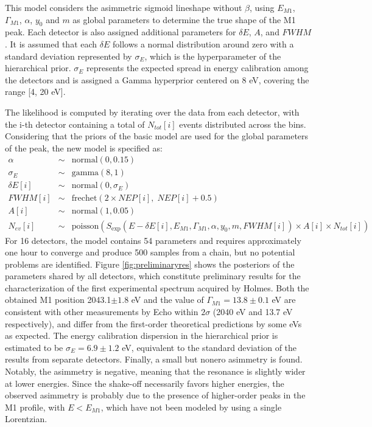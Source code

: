 This model considers the asimmetric sigmoid lineshape without $\beta$, using $E_{M 1}$, $\Gamma_{ M 1}$, $\alpha$, $y_0$
and $m$ as global parameters to determine the true shape of the M1 peak.
Each detector is also assigned additional parameters for $\delta E$, $A$, and $FWHM$. It is assumed that each $\delta E$ follows a normal distribution around zero with a standard deviation represented by $\sigma_E$, which is the hyperparameter of the hierarchical prior.
$\sigma_E$ represents the expected spread in energy calibration among the detectors and is assigned a Gamma hyperprior centered on 8 eV, covering the range [4, 20 eV].

The likelihood is computed by iterating over the data from each detector, with the i-th detector containing a total of
$N_{tot}[i]$ events distributed across the bins. Considering that the priors of the basic model are used for the global
parameters of the peak, the new model is specified as:
\begin{eqnarray}
  \alpha &\sim& \text{normal}(0,0.15)\\
  \sigma_E &\sim& \text{gamma}(8, 1)\\
  \delta E[i] &\sim& \text{normal}(0, \sigma_E)\\
  FWHM[i] &\sim& \text{frechet}(2\times NEP[i], \;NEP[i]+0.5)\\
  A[i] &\sim& \text{normal}(1, 0.05)\\
  N_{ev}[i] &\sim& \text{poisson}(S_{\exp}(E-\delta E[i], E_{M 1}, \Gamma_{M 1}, \alpha, y_0, m, FWHM[i])\times A[i]
  \times N_{tot}[i])\qquad
\end{eqnarray}
For 16 detectors, the model contains 54 parameters and requires approximately one hour to converge and produce 500
samples from a chain, but no potential problems are identified.
Figure \ref{fig:preliminaryres} shows the posteriors of the parameters shared by all detectors, which constitute
preliminary results for the characterization of the first experimental spectrum acquired by Holmes. 
Both the obtained M1 position 2043.1$\pm 1.8$ eV and the value of $\Gamma_{M 1}=13.8\pm 0.1$ eV are consistent with other
measurements by Echo  \cite{thirdorder} within $2\sigma$ (2040 eV and 13.7 eV respectively), and differ from the first-order theoretical
predictions by some eVs as expected. 
The energy calibration dispersion in the hierarchical prior is estimated to be $\sigma_E = 6.9\pm 1.2$ eV, equivalent to the
standard deviation of the results from separate detectors. Finally, a small but nonero asimmetry is found.
Notably, the asimmetry is negative, meaning that the resonance is slightly wider at lower energies. Since the shake-off
necessarily favors higher energies, the observed asimmetry is probably due to the presence of higher-order peaks in the
M1 profile, with $E<E_{M 1}$, which have not been modeled by using a single Lorentzian.


